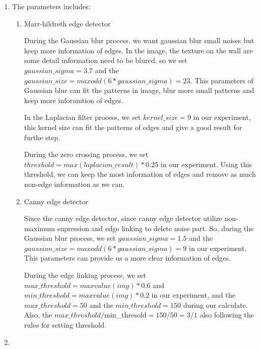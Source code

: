 \documentclass[12pt]{article}
\begin{document}
\begin{enumerate}[leftmargin=\labelsep]
\begin{enumerate}
    \item The parameters includes:
    \begin{enumerate}
        \item Marr-hildreth edge detector
            
        During the Gaussian blur process, we want gaussian blur small noises but keep more information of edges. In the image, the texture on the wall are some detail information need to be blured. 
        so we set $gaussian\_sigma = 3.7$ and the $gaussian\_size = max odd(6 * gaussian\_sigma) = 23$.  
        This parameters of Gaussian blur can fit the patterns in image, blur more small patterns and keep more inforamtion of edges.

        In the Laplacian filter process, we set $kernel\_size = 9$ in our experiment, this kernel size can fit the patterns of edges and give a good result for furthe step.

        During the zero crossing process, we set $threshold = max(laplacion\_result) * 0.25$ in our experiment. 
        Using this threshold, we can keep the most information of edges and remove as much non-edge information as we can.

        \item Canny edge detector
        
        Since the canny edge detector, since canny edge detector utilize non-maximum supression and edge linking to delete noise part. 
        So, during the Gaussian blur process, we set $gaussian\_sigma = 1.5$ and the $gaussian\_size = max odd(6 * gaussian\_sigma) = 9$ in our experiment. 
        This parameters can provide us a more clear information of edges.

        During the edge linking process, we set $max\_threshold = max value(img) * 0.6$ and $min\_threshold = max value(img) * 0.2$ in our experiment, and the $max\_threshold = 50$ and the $min\_threshold = 150$ during our calculate. 
        Also, the $max\_threshold / $min\_thresold$ = 150/50 = 3/1$ also following the rules for setting threshold.        
            
    \end{enumerate}
    


    \item 


\end{enumerate}
\end{enumerate}
\end{document}
